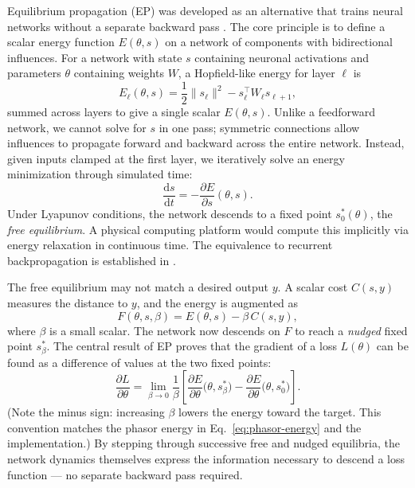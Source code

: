 \documentclass[11pt]{article}
\newcommand{\dd}{\mathrm{d}}
\begin{document}
Equilibrium propagation (EP) was developed as an alternative that trains neural networks without a separate backward pass \citep{scellier2017equilibrium}. The core principle is to define a scalar energy function $E(\theta, s)$ on a network of components with bidirectional influences. For a network with state $s$ containing neuronal activations and parameters $\theta$ containing weights $W$, a Hopfield-like energy for layer $\ell$ is
\begin{equation}
E_\ell(\theta, s) = \frac{1}{2}\|s_\ell\|^2 - s_\ell^\top W_\ell s_{\ell+1},
\end{equation}
summed across layers to give a single scalar $E(\theta, s)$. Unlike a feedforward network, we cannot solve for $s$ in one pass; symmetric connections allow influences to propagate forward and backward across the entire network. Instead, given inputs clamped at the first layer, we iteratively solve an energy minimization through simulated time:
\begin{equation}
\frac{\dd s}{\dd t} = -\frac{\partial E}{\partial s}(\theta, s).
\end{equation}
Under Lyapunov conditions, the network descends to a fixed point $s_0^*(\theta)$, the \emph{free equilibrium}. A physical computing platform would compute this implicitly via energy relaxation in continuous time. The equivalence to recurrent backpropagation is established in \citep{scellier2018equivalence}.

The free equilibrium may not match a desired output $y$. A scalar cost $C(s,y)$ measures the distance to $y$, and the energy is augmented as
\begin{equation}
F(\theta, s, \beta) = E(\theta, s) - \beta\, C(s, y),
\end{equation}
where $\beta$ is a small scalar. The network now descends on $F$ to reach a \emph{nudged} fixed point $s_\beta^*$. The central result of EP proves that the gradient of a loss $L(\theta)$ can be found as a difference of values at the two fixed points:
\begin{equation}
\frac{\partial L}{\partial \theta} = \lim_{\beta \to 0} \frac{1}{\beta}\left[\frac{\partial E}{\partial \theta}\big(\theta, s_\beta^*\big) - \frac{\partial E}{\partial \theta}\big(\theta, s_0^*\big)\right].
\end{equation}
(Note the minus sign: increasing $\beta$ lowers the energy toward the target. This convention matches the phasor energy in Eq.~\ref{eq:phasor-energy} and the implementation.)
By stepping through successive free and nudged equilibria, the network dynamics themselves express the information necessary to descend a loss function --- no separate backward pass required.
\end{document}
